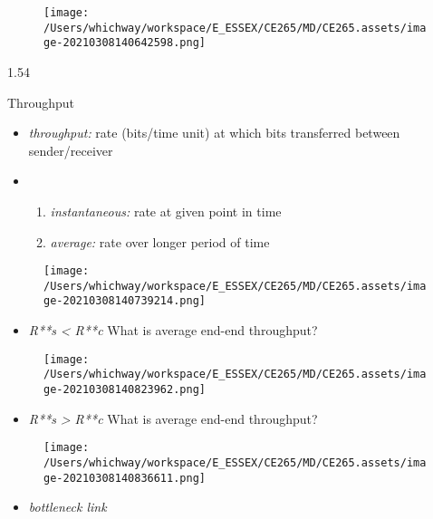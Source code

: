 \documentclass[
]{article}
\begin{document}
\begin{figure}
\centering
\texttt{[image: /Users/whichway/workspace/E\_ESSEX/CE265/MD/CE265.assets/image-20210308140642598.png]}
\caption{}
\end{figure}

1.54

Throughput

\begin{itemize}
\item
  \emph{throughput:} rate (bits/time unit) at which bits transferred
  between sender/receiver
\item
  \begin{enumerate}
  \def\labelenumi{\arabic{enumi}.}
  \item
    \emph{instantaneous:} rate at given point in time
  \item
    \emph{average:} rate over longer period of time
  \end{enumerate}
\end{itemize}

\begin{figure}
\centering
\texttt{[image: /Users/whichway/workspace/E\_ESSEX/CE265/MD/CE265.assets/image-20210308140739214.png]}
\caption{}
\end{figure}

\begin{itemize}
\item
  \emph{R**s} \emph{\textless{} R**c} What is average end-end
  throughput?
\end{itemize}

\begin{figure}
\centering
\texttt{[image: /Users/whichway/workspace/E\_ESSEX/CE265/MD/CE265.assets/image-20210308140823962.png]}
\caption{}
\end{figure}

\begin{itemize}
\item
  \emph{R**s} \emph{\textgreater{} R**c} What is average end-end
  throughput?
\end{itemize}

\begin{figure}
\centering
\texttt{[image: /Users/whichway/workspace/E\_ESSEX/CE265/MD/CE265.assets/image-20210308140836611.png]}
\caption{}
\end{figure}

\begin{itemize}
\item
  \emph{bottleneck link}
\end{itemize}
\end{document}
